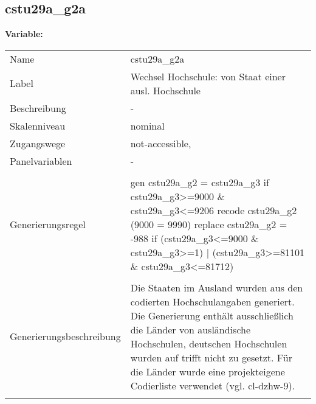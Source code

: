 	
	
	\subsection{cstu29a\_g2a}
	\label{subSection:cstu29a_g2a}

	\noindent\textbf{Variable:}\\
		\begin{tabular}{lL{11.3cm}}
			\label{tableVariable:cstu29a_g2a}
			Name & cstu29a\_g2a \\
			Label & Wechsel Hochschule: von Staat einer ausl. Hochschule \\
			Beschreibung & - \\
			Skalenniveau & nominal \\
			Zugangswege &
				not-accessible,
 \\
			Panelvariablen & -
			 \\
			 \\
					Generierungsregel & gen cstu29a\_g2 = cstu29a\_g3 if cstu29a\_g3\textgreater{}=9000 \& cstu29a\_g3\textless{}=9206
recode cstu29a\_g2 (9000 = 9990)
replace cstu29a\_g2 = -988 if (cstu29a\_g3\textless{}=9000 \& cstu29a\_g3\textgreater{}=1) | (cstu29a\_g3\textgreater{}=81101 \& cstu29a\_g3\textless{}=81712) \\
				 \\
					Generierungsbeschreibung & Die Staaten im Ausland wurden aus den codierten Hochschulangaben generiert. Die Generierung enthält ausschließlich die Länder von ausländische Hochschulen, deutschen Hochschulen wurden auf trifft nicht zu gesetzt. Für die Länder wurde eine projekteigene Codierliste verwendet (vgl. cl-dzhw-9).
				 \\	
			 \\
		\end{tabular}






	
	\newpage
